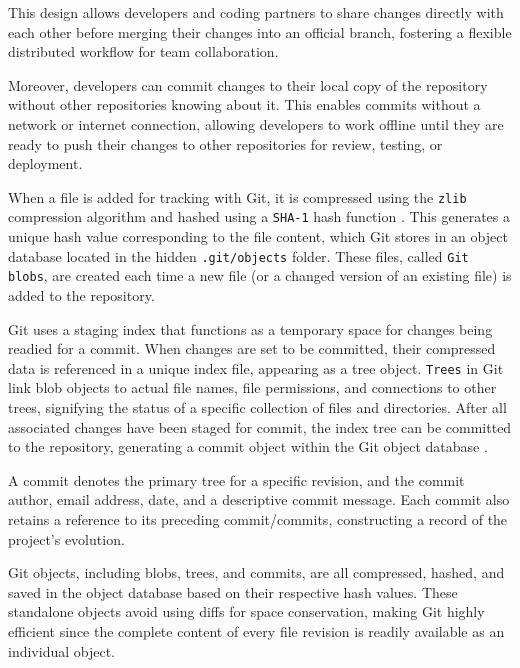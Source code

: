 This design allows developers and coding partners to share changes directly with each other before merging their changes into an official branch, fostering a flexible distributed workflow for team collaboration.
\smallskip

Moreover, developers can commit changes to their local copy of the repository without other repositories knowing about it. This enables commits without a network or internet connection, allowing developers to work offline until they are ready to push their changes to other repositories for review, testing, or deployment.
\smallskip

When a file is added for tracking with Git, it is compressed using the \lstinline{zlib} compression algorithm and hashed using a \lstinline{SHA-1} hash function \cite{stopak_2019}. This generates a unique hash value corresponding to the file content, which Git stores in an object database located in the hidden \lstinline{.git/objects} folder. These files, called \lstinline{Git blobs}, are created each time a new file (or a changed version of an existing file) is added to the repository.
\smallskip

Git uses a staging index that functions as a temporary space for changes being readied for a commit. When changes are set to be committed, their compressed data is referenced in a unique index file, appearing as a tree object. \lstinline{Trees} in Git link blob objects to actual file names, file permissions, and connections to other trees, signifying the status of a specific collection of files and directories. After all associated changes have been staged for commit, the index tree can be committed to the repository, generating a commit object within the Git object database \cite{stopak_2019}.
\smallskip

A commit denotes the primary tree for a specific revision, and the commit author, email address, date, and a descriptive commit message. Each commit also retains a reference to its preceding commit/commits, constructing a record of the project's evolution.
\smallskip

Git objects, including blobs, trees, and commits, are all compressed, hashed, and saved in the object database based on their respective hash values. These standalone objects avoid using diffs for space conservation, making Git highly efficient since the complete content of every file revision is readily available as an individual object.


